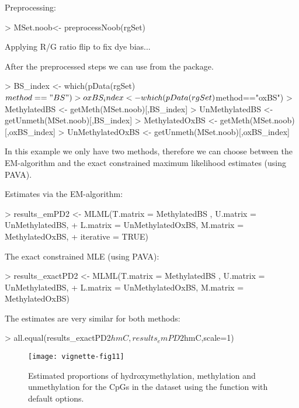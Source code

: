\documentclass{article}
\begin{document}
Preprocessing:
\begin{Schunk}
\begin{Sinput}
> MSet.noob<- preprocessNoob(rgSet)
\end{Sinput}
\begin{Soutput}
[preprocessNoob] Applying R/G ratio flip to fix dye bias...
\end{Soutput}
\end{Schunk}


After the preprocessed steps we can use  from the  package.


\begin{Schunk}
\begin{Sinput}
> BS_index <- which(pData(rgSet)$method=="BS")
> oxBS_index <- which(pData(rgSet)$method=="oxBS")
> MethylatedBS <- getMeth(MSet.noob)[,BS_index]
> UnMethylatedBS <- getUnmeth(MSet.noob)[,BS_index]
> MethylatedOxBS <- getMeth(MSet.noob)[,oxBS_index]
> UnMethylatedOxBS <- getUnmeth(MSet.noob)[,oxBS_index]
\end{Sinput}
\end{Schunk}



In this example we only have two methods, therefore we can choose between the EM-algorithm and the exact constrained maximum likelihood estimates (using PAVA).

Estimates via the EM-algorithm:

\begin{Schunk}
\begin{Sinput}
> results_emPD2 <- MLML(T.matrix = MethylatedBS , U.matrix = UnMethylatedBS,
+                    L.matrix = UnMethylatedOxBS, M.matrix = MethylatedOxBS,
+                    iterative = TRUE)
\end{Sinput}
\end{Schunk}


The exact constrained MLE (using PAVA):

\begin{Schunk}
\begin{Sinput}
> results_exactPD2 <- MLML(T.matrix = MethylatedBS , U.matrix = UnMethylatedBS,
+                       L.matrix = UnMethylatedOxBS, M.matrix = MethylatedOxBS)
\end{Sinput}
\end{Schunk}

The estimates are very similar for both methods:
\begin{Schunk}
\begin{Sinput}
> all.equal(results_exactPD2$hmC,results_emPD2$hmC,scale=1)
\end{Sinput}
\end{Schunk}



\begin{figure*}[h]
 \texttt{[image: vignette-fig11]}
 \caption{\label{fig:fig11} Estimated proportions of hydroxymethylation, methylation and unmethylation for the CpGs in the dataset using the  function with default options.}
\end{figure*}



\end{document}

